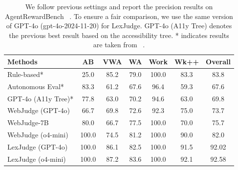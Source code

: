 \begin{table}[t]
\centering
\small
\setlength{\tabcolsep}{6pt}
\caption{We follow previous settings and report the precision results on AgentRewardBench ~\cite{lù2025agentrewardbenchevaluatingautomaticevaluations}.
To ensure a fair comparison, we use the same version of GPT-4o (gpt-4o-2024-11-20) for LexJudge.
GPT-4o (A11y Tree) denotes the previous best result based on the accessibility tree.
* indicates results are taken from ~\citet{lù2025agentrewardbenchevaluatingautomaticevaluations}.}
\label{tab:agentrewardbench_precision}
\begin{tabular}{lcccccc}
\toprule
Methods & AB & VWA & WA & Work & Wk++ & Overall \\
\midrule
Rule-based*            & 25.0 & 85.2 & 79.0 & 100.0 & 83.3 & 83.8 \\
Autonomous Eval*       & 83.3 & 61.2 & 67.6 & 96.4  & 59.3 & 67.6 \\
GPT-4o (A11y Tree)*    & 77.8 & 63.0 & 70.2 & 94.6  & 63.0 & 69.8 \\
WebJudge (GPT-4o)      & 66.7 & 69.8 & 72.6 & 92.3  & 75.0 & 73.7 \\
WebJudge-7B            & 80.0 & 66.7 & 77.5 & 100.0 & 70.0 & 75.7 \\
WebJudge (o4-mini)     & 100.0 & 74.5 & 81.2 & 100.0 & 90.0 & 82.0 \\
\midrule
 \rowcolor{tableblue}
 LexJudge (GPT-4o)   &100.0 &86.1 &82.5 & 100.0 &91.5   &92.02 \\
  \rowcolor{tableblue}
LexJudge (o4-mini)   &100.0 &87.2 &83.6 & 100.0 &92.1   &92.58  \\\bottomrule
\end{tabular}
\end{table}
